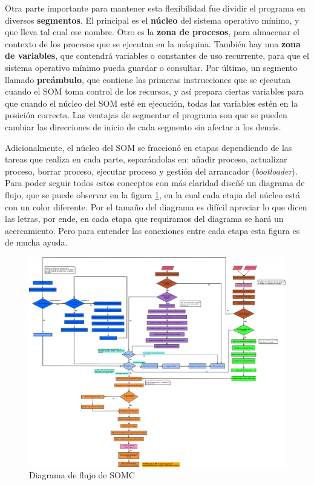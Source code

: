 \documentclass[letterpaper,12pt,oneside]{book}
\begin{document}
		Otra parte importante para mantener esta flexibilidad fue dividir el programa en diversos \textbf{segmentos}. El principal es el \textbf{núcleo} 
		del
		sistema operativo mínimo, y que lleva tal cual ese nombre. Otro es la \textbf{zona de procesos}, para almacenar el contexto de los
		procesos que se ejecutan en la máquina. También hay una \textbf{zona de variables}, que contendrá variables o constantes de uso 
		recurrente,
		para que el sistema operativo mínimo pueda guardar o consultar. Por último, un segmento llamado \textbf{preámbulo}, que contiene las primeras 
		instrucciones
		que se ejecutan cuando el SOM toma control de los recursos, y así prepara ciertas variables para que cuando el núcleo del SOM esté en ejecución,
		todas las variables estén en la posición correcta. Las ventajas de segmentar el programa son que se pueden cambiar las direcciones de inicio de 
		cada segmento sin afectar a los demás.

		
		Adicionalmente, el núcleo del SOM se fraccionó en etapas dependiendo de las tareas que realiza en cada parte, separándolas en:
		añadir proceso, actualizar proceso, borrar proceso, ejecutar proceso y gestión del arrancador (\textit{bootloader}). Para poder seguir todos 
		estos conceptos con más claridad
		  diseñé un diagrama de flujo, que se puede observar en la figura \ref{fig:diagramaSOMC},
		   en la cual cada etapa del núcleo está con un color diferente. Por el tamaño del diagrama es difícil apreciar lo que dicen las letras, por ende,
		en cada etapa que requiramos del diagrama se hará un acercamiento. Pero para entender
		las conexiones entre cada etapa esta figura es de mucha ayuda.
		

		\begin{figure}[p]		
			\centering
			\includegraphics[width=\textwidth,height=\textheight,keepaspectratio]{media/CARDIACC/Diagrama_Flujo_SO.eps}
			\caption{Diagrama de flujo de SOMC}
			\label{fig:diagramaSOMC}
		\end{figure}		
		
\end{document}
